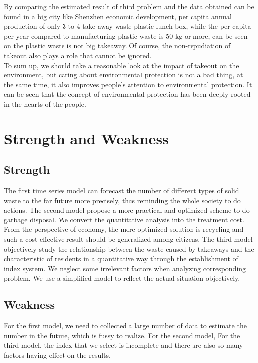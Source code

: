 \documentclass[UTF8]{article}
\begin{document}
\indent By comparing the estimated result of third problem and the data obtained can be found in a big city like Shenzhen economic development, per capita annual production of only 3 to 4 take away waste plastic lunch box, while the per capita per year compared to manufacturing plastic waste is 50 kg or more, can be seen on the plastic waste is not big takeaway. Of course, the non-repudiation of takeout also plays a role that cannot be ignored.\\
\indent To sum up, we should take a reasonable look at the impact of takeout on the environment, but caring about environmental protection is not a bad thing, at the same time, it also improves people's attention to environmental protection. It can be seen that the concept of environmental protection has been deeply rooted in the hearts of the people.
\newpage

\section{Strength and Weakness}
\subsection{Strength}
The first time series model can forecast the number of different types of solid waste to the far future more precisely, thus reminding the whole society to do actions.
The second model propose a more practical and optimized scheme to do garbage disposal. We convert the quantitative analysis into the treatment cost. From the perspective of economy, the more optimized solution is recycling and such a cost-effective result should be generalized among citizens.
The third model objectively study the relationship between the waste caused by takeaways and the characteristic of residents in a quantitative way through the establishment of index system.
We neglect some irrelevant factors when analyzing corresponding problem. We use a simplified model to reflect the actual situation objectively.
\subsection{Weakness}
For the first model, we need to collected a large number of data to estimate the number in the future, which is fussy to realize.
For the second model,
For the third model, the index that we select is incomplete and there are also so many factors having effect on the results.
\newpage
\end{document}
